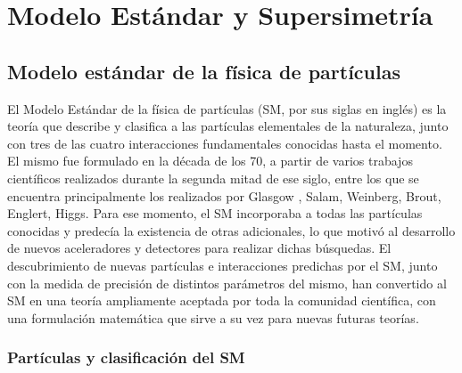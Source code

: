 \chapter{Modelo Estándar y Supersimetría}

\section{Modelo estándar de la física de partículas}

El Modelo Estándar de la física de partículas (SM, por sus siglas en inglés) es la teoría que describe y clasifica a las partículas elementales de la naturaleza, junto con tres de las cuatro interacciones fundamentales conocidas hasta el momento. El mismo fue formulado en la década de los 70, a partir de varios trabajos científicos realizados durante la segunda mitad de ese siglo, entre los que se encuentra principalmente los realizados por Glasgow \cite{GLASHOW1961579}, Salam\cite{salam}, Weinberg\cite{PhysRevLett.19.1264}, Brout, Englert, Higgs\cite{PhysRevLett.13.321, PhysRevLett.13.508,PhysRevLett.13.585}. Para ese momento, el SM incorporaba a todas las partículas conocidas y predecía la existencia de otras adicionales, lo que motivó al desarrollo de nuevos aceleradores y detectores para realizar dichas búsquedas. El descubrimiento de nuevas partículas e interacciones predichas por el SM, junto con la medida de precisión de distintos parámetros del mismo, han convertido al SM en una teoría ampliamente aceptada por toda la comunidad científica, con una formulación matemática que sirve a su vez para nuevas futuras teorías.

\subsection{Partículas y clasificación del SM}

